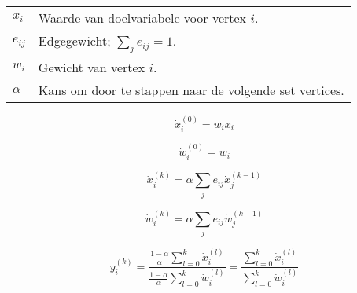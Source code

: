 \documentclass[a4paper]{article}
\begin{document}
\begin{tabular}{l p{}}
  $x_i$    & Waarde van doelvariabele voor vertex $i$.\\
  $e_{ij}$ & Edgegewicht; $\sum_j e_{ij} = 1$. \\
  $w_i$    & Gewicht van vertex $i$.\\
  $\alpha$ & Kans om door te stappen naar de volgende set vertices.
\end{tabular}

\begin{equation}
  \dot{x}_i^{(0)} = w_i x_i
\end{equation}

\begin{equation}
  \dot{w}_i^{(0)} = w_i
\end{equation}

\begin{equation}
  \dot{x}_i^{(k)} = \alpha \sum_j e_{ij} \dot{x}_j^{(k-1)} 
\end{equation}

\begin{equation}
  \dot{w}_i^{(k)} = \alpha \sum_je_{ij} \dot{w}_j^{(k-1)}
\end{equation}

\begin{equation}
  y_i^{(k)} = \frac{
      \frac{1-\alpha}{\alpha} \sum_{l = 0}^{k} \dot{x}_i^{(l)}
    }{
      \frac{1-\alpha}{\alpha} \sum_{l = 0}^{k} \dot{w}_i^{(l)}
    } = 
    \frac{
      \sum_{l = 0}^{k} \dot{x}_i^{(l)}
    }{
      \sum_{l = 0}^{k} \dot{w}_i^{(l)}
    }
\end{equation}
\end{document}

